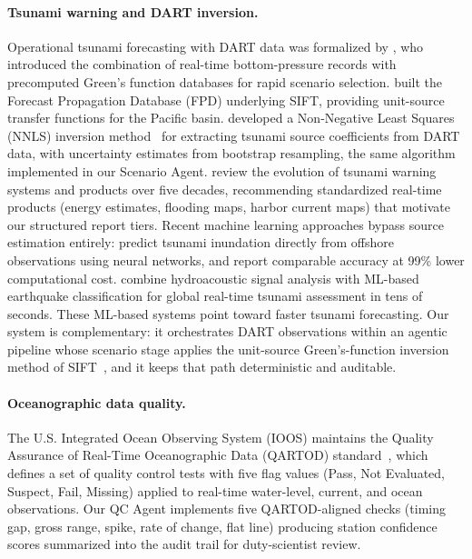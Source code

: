 \documentclass{article}
\begin{document}
\paragraph{Tsunami warning and DART inversion.}
Operational tsunami forecasting with DART data was formalized by
\citet{titov2005realtime}, who introduced the combination of real-time
bottom-pressure records with precomputed Green's function databases for
rapid scenario selection. \citet{gica2008development} built the
Forecast Propagation Database (FPD) underlying SIFT, providing
unit-source transfer functions for the Pacific basin.
\citet{percival2011extraction} developed a
Non-Negative Least Squares (NNLS) inversion method~\citep{lawson1974solving} for extracting tsunami
source coefficients from DART data, with uncertainty estimates from
bootstrap resampling, the same algorithm implemented in our Scenario
Agent. \citet{bernard2015evolution} review the evolution of tsunami
warning systems and products over five decades, recommending
standardized real-time products (energy estimates, flooding maps,
harbor current maps) that motivate our structured report tiers.
Recent machine learning approaches bypass source estimation
entirely: \citet{mulia2022machine} predict tsunami inundation directly
from offshore observations using neural networks, and report comparable
accuracy at 99\% lower computational cost. \citet{kadri2025great}
combine hydroacoustic signal analysis with ML-based earthquake
classification for global real-time tsunami assessment in tens of
seconds. These ML-based systems point toward faster tsunami forecasting. Our
system is complementary: it orchestrates DART observations within an
agentic pipeline whose scenario stage applies the unit-source
Green's-function inversion method of SIFT~\citep{titov2005realtime},
and it keeps that path deterministic and auditable.

\paragraph{Oceanographic data quality.}
The U.S. Integrated Ocean Observing System (IOOS) maintains the Quality
Assurance of Real-Time Oceanographic Data (QARTOD) standard~\citep{ioos2021qartod}, which defines a set of quality
control tests with five flag values (Pass, Not Evaluated, Suspect,
Fail, Missing) applied to real-time water-level, current, and ocean
observations. Our
QC Agent implements five QARTOD-aligned checks (timing gap, gross range,
spike, rate of change, flat line) producing station confidence scores
summarized into the audit trail for duty-scientist review.
\end{document}
